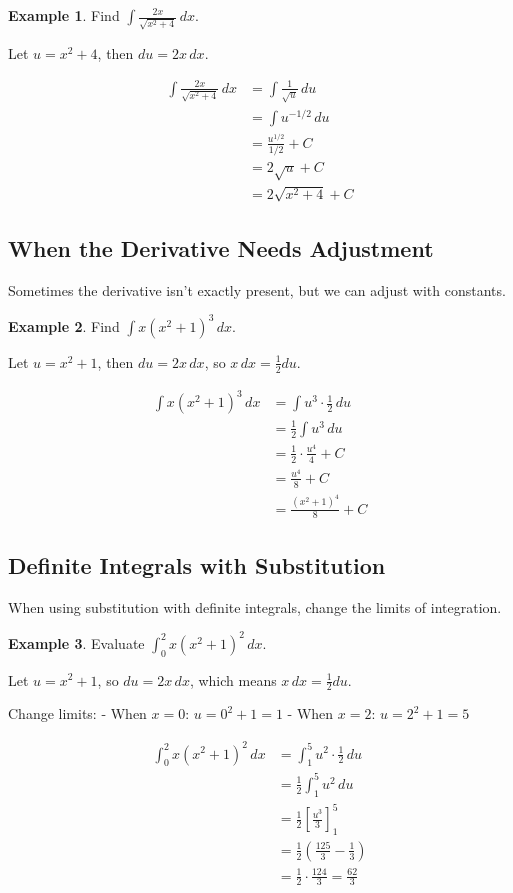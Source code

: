 \documentclass[12pt,a4paper]{book}
\theoremstyle{definition}
\newtheorem{example}{Example}[chapter]
\begin{document}
\begin{example}
Find $\int \frac{2x}{\sqrt{x^2 + 4}} \, dx$.

Let $u = x^2 + 4$, then $du = 2x \, dx$.

\begin{align}
\int \frac{2x}{\sqrt{x^2 + 4}} \, dx &= \int \frac{1}{\sqrt{u}} \, du\\
&= \int u^{-1/2} \, du\\
&= \frac{u^{1/2}}{1/2} + C\\
&= 2\sqrt{u} + C\\
&= 2\sqrt{x^2 + 4} + C
\end{align}
\end{example}

\subsection{When the Derivative Needs Adjustment}

Sometimes the derivative isn't exactly present, but we can adjust with constants.

\begin{example}
Find $\int x(x^2 + 1)^3 \, dx$.

Let $u = x^2 + 1$, then $du = 2x \, dx$, so $x \, dx = \frac{1}{2} du$.

\begin{align}
\int x(x^2 + 1)^3 \, dx &= \int u^3 \cdot \frac{1}{2} \, du\\
&= \frac{1}{2} \int u^3 \, du\\
&= \frac{1}{2} \cdot \frac{u^4}{4} + C\\
&= \frac{u^4}{8} + C\\
&= \frac{(x^2 + 1)^4}{8} + C
\end{align}
\end{example}

\subsection{Definite Integrals with Substitution}

When using substitution with definite integrals, change the limits of integration.

\begin{example}
Evaluate $\int_0^2 x(x^2 + 1)^2 \, dx$.

Let $u = x^2 + 1$, so $du = 2x \, dx$, which means $x \, dx = \frac{1}{2} du$.

Change limits:
- When $x = 0$: $u = 0^2 + 1 = 1$
- When $x = 2$: $u = 2^2 + 1 = 5$

\begin{align}
\int_0^2 x(x^2 + 1)^2 \, dx &= \int_1^5 u^2 \cdot \frac{1}{2} \, du\\
&= \frac{1}{2} \int_1^5 u^2 \, du\\
&= \frac{1}{2} \left[ \frac{u^3}{3} \right]_1^5\\
&= \frac{1}{2} \left( \frac{125}{3} - \frac{1}{3} \right)\\
&= \frac{1}{2} \cdot \frac{124}{3} = \frac{62}{3}
\end{align}
\end{example}
\end{document}

